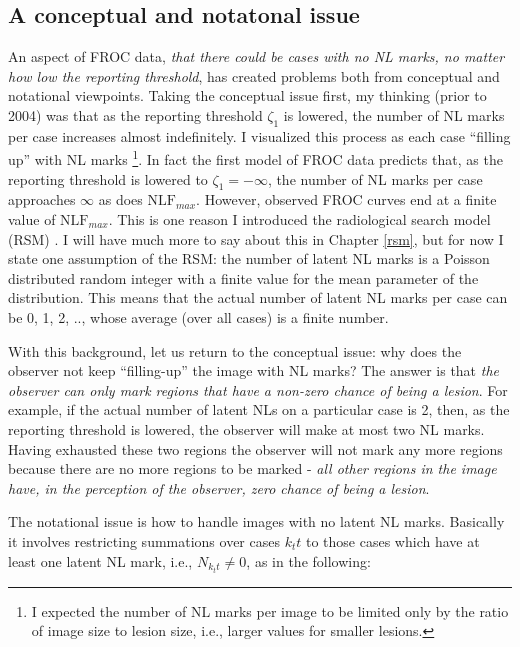 \documentclass[
]{book}
\begin{document}
\hypertarget{froc-empirical-indexing-marks}{%
\subsection{A conceptual and notatonal issue}\label{froc-empirical-indexing-marks}}

An aspect of FROC data, \emph{that there could be cases with no NL marks, no matter how low the reporting threshold}, has created problems both from conceptual and notational viewpoints. Taking the conceptual issue first, my thinking (prior to 2004) was that as the reporting threshold \(\zeta_1\) is lowered, the number of NL marks per case increases almost indefinitely. I visualized this process as each case ``filling up'' with NL marks \footnote{I expected the number of NL marks per image to be limited only by the ratio of image size to lesion size, i.e., larger values for smaller lesions.}. In fact the first model of FROC data \citep{chakraborty1989maximum} predicts that, as the reporting threshold is lowered to \(\zeta_1 = -\infty\), the number of NL marks per case approaches \(\infty\) as does \(\text{NLF}_{max}\). However, observed FROC curves end at a finite value of \(\text{NLF}_{max}\). This is one reason I introduced the radiological search model (RSM) \citep{chakraborty2006search}. I will have much more to say about this in Chapter \ref{rsm}, but for now I state one assumption of the RSM: the number of latent NL marks is a Poisson distributed random integer with a finite value for the mean parameter of the distribution. This means that the actual number of latent NL marks per case can be 0, 1, 2, .., whose average (over all cases) is a finite number.

With this background, let us return to the conceptual issue: why does the observer not keep ``filling-up'' the image with NL marks? The answer is that \emph{the observer can only mark regions that have a non-zero chance of being a lesion}. For example, if the actual number of latent NLs on a particular case is 2, then, as the reporting threshold is lowered, the observer will make at most two NL marks. Having exhausted these two regions the observer will not mark any more regions because there are no more regions to be marked - \emph{all other regions in the image have, in the perception of the observer, zero chance of being a lesion}.

The notational issue is how to handle images with no latent NL marks. Basically it involves restricting summations over cases \(k_ t t\) to those cases which have at least one latent NL mark, i.e., \(N_{k_t t} \neq 0\), as in the following:
\end{document}

